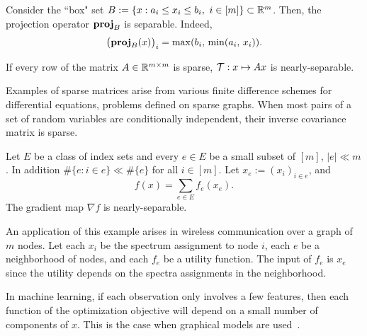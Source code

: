 \begin{example}\label{exp:proj-box}
Consider the ``box" set $B:=\{x:a_i\leq x_i\leq b_i,~i \in [m]\}\subset\mathbb{R}^m$. Then, the projection operator ${\mathbf{proj}}_{B}$ is separable. Indeed,
$$\big({\mathbf{proj}}_{B}(x)\big)_i=\max(b_i,\,\min(a_i,\, x_i)).$$
\end{example}


\begin{example} If every row of the matrix $A\in\mathbb{R}^{m\times m}$ is sparse,   ${\mathcal{T}} :x\mapsto Ax$ is nearly-separable.

Examples of sparse matrices arise from various finite difference schemes for differential equations, problems defined on sparse graphs. When most pairs of a set of random variables  are conditionally independent, their inverse covariance matrix is sparse.
\end{example}

\begin{example}
Let $E$ be a class of index sets and every $e\in E$ be a small subset of $[m]$, $|e|\ll m$. In addition $\#\{e:i\in e\}\ll \#\{e\}$ for all $i\in [m]$.
Let $x_e:=(x_i)_{i\in e}$, and  
$$f(x) = \sum_{e \in E} f_e (x_e).$$ 
The gradient map $\nabla f$ is nearly-separable.


An application of this example arises in wireless communication over  a graph of $m$ nodes. Let each $x_i$ be the spectrum assignment to node $i$, each $e$ be a neighborhood of nodes,  and each   $f_e$ be a utility function. The input of $f_e$ is $x_e$ since the utility depends on the spectra assignments in the neighborhood.

In machine learning, if each observation only involves a few features, then each function of the optimization objective will depend on a  small number of components of $x$. This is the case when graphical models are used~\cite{rue2005gaussian,bengio2006label}. 
\end{example}

